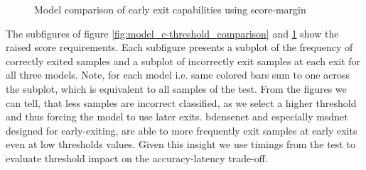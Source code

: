 \begin{minipage}{\linewidth}
\begin{figure}
		\hfill
		\hfill
		\hfill
		\hfill
		
		\caption[Model comparison of early exit capabilities]{Model comparison of early exit capabilities using score-margin}
		\label{fig:model_threshold_comparison}
	\end{figure}
	
\end{minipage}

The subfigures of figure \ref{fig:model_c-threshold_comparison} and \ref{fig:model_threshold_comparison} show the raised score requirements. Each subfigure presents a subplot of the frequency of correctly exited samples and a subplot of incorrectly exit samples at each exit for all three models. Note, for each model i.e. same colored bars sum to one across the subplot, which is equivalent to all samples of the test. From the figures we can tell, that less samples are incorrect classified, as we select a higher threshold and thus forcing the model to use later exits. \gls{bdensenet} and especially \gls{msdnet} designed for early-exiting, are able to more frequently exit samples at early exits even at low thresholds values. Given this insight we use timings from the test to evaluate threshold impact on the accuracy-latency trade-off.

